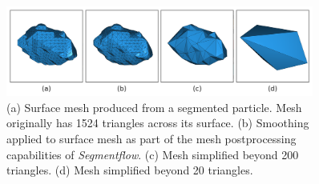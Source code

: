 \begin{figure}[ht]
    \centering
    \includegraphics[width=0.9\textwidth]{figures/06/06-26259-mesh-tris-1524-190-10.png}
    \caption{
        \small{}
        (a) Surface mesh produced from a segmented particle. Mesh originally
        has 1524 triangles across its surface.
        (b) Smoothing applied to surface mesh as part of the mesh
        postprocessing capabilities of \textit{Segmentflow}.
        (c) Mesh simplified beyond 200 triangles.
        (d) Mesh simplified beyond 20 triangles.
    }
    \label{fig/06/postprocess}
\end{figure}

